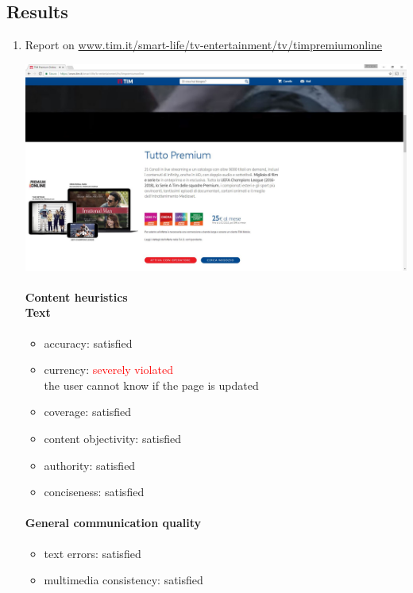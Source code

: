 \subsection{Results}
\begin{enumerate}
	
	
\item Report on \url{www.tim.it/smart-life/tv-entertainment/tv/timpremiumonline}

\begin{center}
	\includegraphics[width=\textwidth]{Screenshot/premium.jpg}
\end{center}
\vspace{1cm}

	\paragraph*{Content heuristics \\ Text}
	\begin{itemize}
		\item accuracy: satisfied
		\item currency: \textcolor{red}{severely violated}\\
		the user cannot know if the page is updated
		\item coverage: satisfied
		\item content objectivity: satisfied
		\item authority: satisfied
		\item conciseness: satisfied		
	\end{itemize}
	
	\paragraph*{General communication quality}
	\begin{itemize}
		\item text errors: satisfied
		\item multimedia consistency: satisfied
	\end{itemize}


\end{enumerate}
